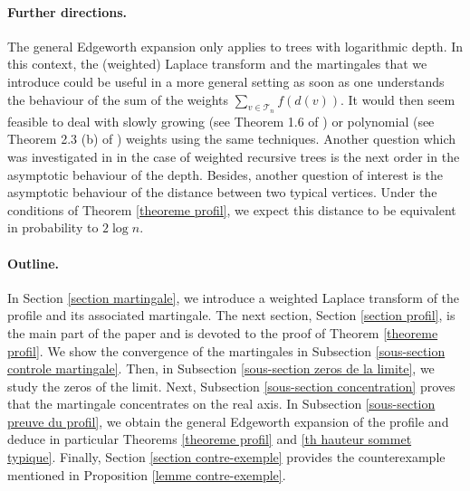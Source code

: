 \documentclass[11pt]{article}
\numberwithin{equation}{section}
\def \T{\mathcal{T}}
\begin{document}
\paragraph{Further directions.} The general Edgeworth expansion only applies to trees with logarithmic depth. In this context, the (weighted) Laplace transform and the martingales that we introduce could be useful in a more general setting as soon as one understands the behaviour of the sum of the weights $\sum_{v \in \T_n} f(d(v))$. It would then seem feasible to deal with slowly growing (see Theorem 1.6 of \cite{LLLM26}) or polynomial (see Theorem 2.3 (b) of \cite{LMW20}) weights using the same techniques. Another question which was investigated in \cite{PS22} in the case of weighted recursive trees is the next order in the asymptotic behaviour of the depth. Besides, another question of interest is the asymptotic behaviour of the distance between two typical vertices. Under the conditions of Theorem \ref{theoreme profil}, we expect this distance to be equivalent in probability to $2 \log n$.
\paragraph{Outline.} In Section \ref{section martingale}, we introduce a weighted Laplace transform of the profile and its associated martingale. The next section, Section \ref{section profil}, is the main part of the paper and is devoted to the proof of Theorem \ref{theoreme profil}. We show the convergence of the martingales in Subsection \ref{sous-section controle martingale}. Then, in Subsection \ref{sous-section zeros de la limite}, we study the zeros of the limit. Next, Subsection \ref{sous-section concentration} proves that the martingale concentrates on the real axis. In Subsection \ref{sous-section preuve du profil}, we obtain the general Edgeworth expansion of the profile and deduce in particular Theorems \ref{theoreme profil} and \ref{th hauteur sommet typique}. Finally, Section \ref{section contre-exemple} provides the counterexample mentioned in Proposition \ref{lemme contre-exemple}. 
\end{document}
